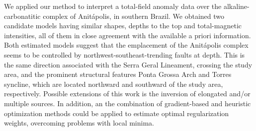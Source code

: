 We applied our method to interpret a total-field anomaly data over the 
alkaline-carbonatitic complex of Anit{\'a}polis, in southern Brazil. 
We obtained two candidate models having similar shapes, depths to the top and 
total-magnetic intensities, all of them in close agreement with the available 
a priori information. Both estimated models suggest that the emplacement of the 
Anit{\'a}polis complex seems to be controlled by northwest-southeast-trending faults at depth.
This is the same direction associated with the Serra Geral Lineament, 
crossing the study area, and the prominent structural features 
Ponta Grossa Arch and Torres syncline, which are located 
northward and southward of the study area, respectively.
Possible extensions of this work is the inversion of elongated and/or multiple 
sources. In addition, an the combination of gradient-based and heuristic optimization 
methods could be applied to estimate optimal regularization weights, 
overcoming problems with local minima.